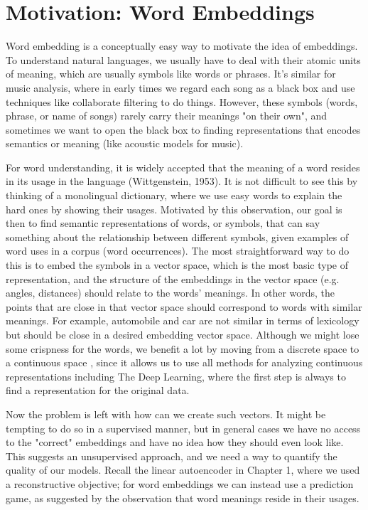 \documentclass[../book-template.tex]{subfiles}
\begin{document}
\section{Motivation: Word Embeddings}
Word embedding is a conceptually easy way to motivate the idea of embeddings. To understand natural languages, we usually have to deal with their atomic units of meaning, which are usually symbols like words or phrases. It's similar for music analysis, where in early times we regard each song as a black box and use techniques like collaborate filtering to do things. However, these symbols (words, phrase, or name of songs) rarely carry their meanings "on their own", and sometimes we want to open the black box to finding representations that encodes semantics or meaning (like acoustic models for music). 
\par For word understanding, it is widely accepted that the meaning of a word resides in its usage in the language (Wittgenstein, 1953). It is not difficult to see this by thinking of a monolingual dictionary, where we use easy words to explain the hard ones by showing their usages. Motivated by this observation, our goal is then to find semantic representations of words, or symbols, that can say something about the relationship between different symbols, given examples of word uses in a corpus (word occurrences). The most straightforward way to do this is to embed the symbols in a vector space, which is the most basic type of representation, and the structure of the embeddings in the vector space (e.g. angles, distances) should relate to the words' meanings. In other words, the points that are close in that vector space should correspond to words with similar meanings. For example, automobile and car are not similar in terms of lexicology but should be close in a desired embedding vector space. Although we might lose some crispness for the words, we benefit a lot by moving from a discrete space to a continuous space , since it allows us to use all methods for analyzing continuous representations including The Deep Learning, where the first step is always to find a representation for the original data. 
\par Now the problem is left with how can we create such vectors. It might be tempting to do so in a supervised manner, but in general cases we have no access to the "correct" embeddings and have no idea how they should even look like. This suggests an unsupervised approach, and we need a way to quantify the quality of our models. Recall the linear autoencoder in Chapter 1, where we used a reconstructive objective; for word embeddings we can instead use a prediction game, as suggested by the observation that word meanings reside in their usages. 
\end{document}
